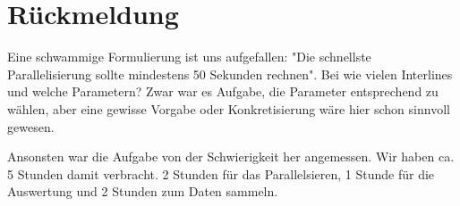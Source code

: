 \documentclass[a4paper]{scrartcl}
\begin{document}
\section{Rückmeldung}

Eine schwammige Formulierung ist uns aufgefallen: "Die schnellste 
Parallelisierung sollte mindestens 50 Sekunden rechnen". Bei wie vielen
Interlines und welche Parametern? Zwar war es Aufgabe, die Parameter entsprechend
zu wählen, aber eine gewisse Vorgabe oder Konkretisierung wäre hier schon 
sinnvoll gewesen.

Ansonsten war die Aufgabe von der Schwierigkeit her angemessen. Wir haben ca.
5 Stunden damit verbracht. 2 Stunden für das Parallelsieren, 1 Stunde für die
Auswertung und 2 Stunden zum Daten sammeln.
\end{document}
